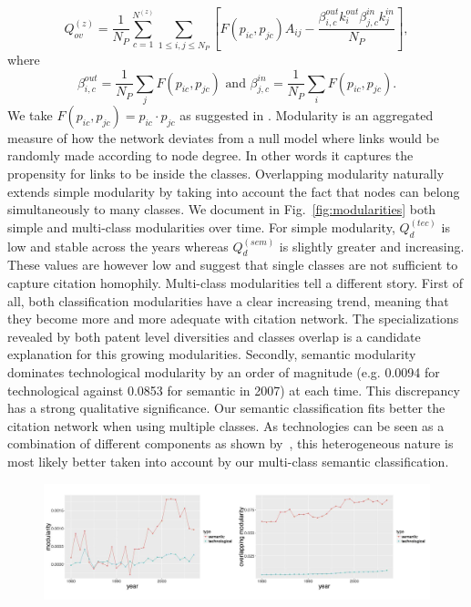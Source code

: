 \[
\displaystyle Q_{ov}^{(z)} = \frac{1}{N_P} \sum_{c = 1}^{N^{(z)}} \sum_{1\leq i,j \leq N_P}\left[F(p_{ic},p_{jc})A_{ij} - \frac{\beta_{i,c}^{out}k_i^{out}\beta_{j,c}^{in}k_j^{in}}{N_P}\right],
\]
where
\[
 \beta_{i,c}^{out} =   \frac{1}{N_P} \displaystyle \sum_j F(p_{ic},p_{jc}) \text{ and } \beta_{j,c}^{in} =  \frac{1}{N_P} \displaystyle \sum_i F(p_{ic},p_{jc}).
\]
We take $F(p_{ic},p_{jc}) = p_{ic}\cdot p_{jc}$ as suggested in \cite{nicosia2009extending}. Modularity is an aggregated measure of how the network deviates from a null model where links would be randomly made according to node degree. In other words it captures the propensity for links to be inside the classes. Overlapping modularity naturally extends simple modularity by taking into account the fact that nodes can belong simultaneously to many classes.
We document in Fig.~\ref{fig:modularities} both simple and multi-class modularities over time. For simple modularity, $Q_d^{(tec)}$ is low and stable across the years whereas $Q_d^{(sem)}$ is slightly greater and increasing. These values are however low and suggest that single classes are not sufficient to capture citation homophily. Multi-class modularities tell a different story. First of all, both classification modularities have a clear increasing trend, meaning that they become more and more adequate with citation network. The specializations revealed by both patent level diversities and classes overlap is a candidate explanation for this growing modularities. Secondly, semantic modularity dominates technological modularity by an order of magnitude (e.g. 0.0094 for technological against 0.0853 for semantic in 2007) at each time. This discrepancy has a strong qualitative significance. Our semantic classification fits better the citation network when using multiple classes. As technologies can be seen as a combination of different components as shown by~\cite{Youn:2015fk}, this heterogeneous nature is most likely better taken into account by our multi-class semantic classification.

\begin{figure}[!ht]
\centering
\includegraphics[width=\linewidth]{Figures/Final/C-patentsmining-modularities.jpg}
\label{fig:patentsmining:modularities}
\end{figure}


